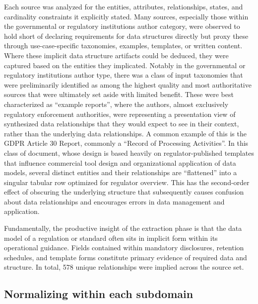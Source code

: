 \documentclass[10pt,letterpaper,twocolumn,twoside]{rho-class/rho}
\begin{document}
Each source was analyzed for the entities, attributes, relationships, states, and cardinality constraints it explicitly stated. Many sources, especially those within the governmental or regulatory institutions author category, were observed to hold short of declaring requirements for data structures directly but proxy these through use-case-specific taxonomies, examples, templates, or written content. Where these implicit data structure artifacts could be deduced, they were captured based on the entities they implicated. Notably in the governmental or regulatory institutions author type, there was a class of input taxonomies that were preliminarily identified as among the highest quality and most authoritative sources that were ultimately set aside with limited benefit. These were best characterized as ``example reports'', where the authors, almost exclusively regulatory enforcement authorities, were representing a presentation view of synthesized data relationships that they would expect to see in their context, rather than the underlying data relationships. A common example of this is the GDPR Article 30 Report, commonly a ``Record of Processing Activities''. In this class of document, whose design is based heavily on regulator-published templates that influence commercial tool design and organizational application of data models, several distinct entities and their relationships are ``flattened'' into a singular tabular row optimized for regulator overview. This has the second-order effect of obscuring the underlying structure that subsequently causes confusion about data relationships and encourages errors in data management and application.

Fundamentally, the productive insight of the extraction phase is that the data model of a regulation or standard often sits in implicit form within its operational guidance. Fields contained within mandatory disclosures, retention schedules, and template forms constitute primary evidence of required data and structure. In total, 578 unique relationships were implied across the source set.

\subsection{Normalizing within each subdomain}\label{sec:normalization}
\end{document}

